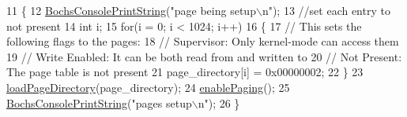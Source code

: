 \begin{DoxyCode}
11                   \{
12     \hyperlink{a00029_a19e1f554d03c977f8b947f21489daa41_a19e1f554d03c977f8b947f21489daa41}{BochsConsolePrintString}(\textcolor{stringliteral}{"page being setup\(\backslash\)n"});
13     \textcolor{comment}{//set each entry to not present}
14     \textcolor{keywordtype}{int} i;
15     \textcolor{keywordflow}{for}(i = 0; i < 1024; i++)
16     \{
17         \textcolor{comment}{// This sets the following flags to the pages:}
18         \textcolor{comment}{//   Supervisor: Only kernel-mode can access them}
19         \textcolor{comment}{//   Write Enabled: It can be both read from and written to}
20         \textcolor{comment}{//   Not Present: The page table is not present}
21         page\_directory[i] = 0x00000002;
22     \}
23     \hyperlink{a00077_abfdf37b9c42cafa83b39f1a41264989c_abfdf37b9c42cafa83b39f1a41264989c}{loadPageDirectory}(page\_directory);
24     \hyperlink{a00077_a8fe3a9cca4b2ccd7a2743e9943880a32_a8fe3a9cca4b2ccd7a2743e9943880a32}{enablePaging}();
25     \hyperlink{a00029_a19e1f554d03c977f8b947f21489daa41_a19e1f554d03c977f8b947f21489daa41}{BochsConsolePrintString}(\textcolor{stringliteral}{"pages setup\(\backslash\)n"});
26 \}
\end{DoxyCode}
